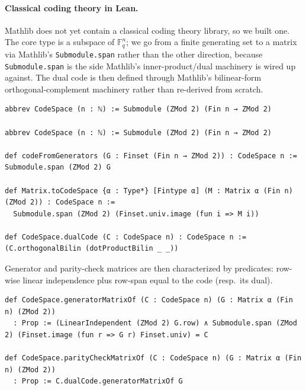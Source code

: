 \paragraph{Classical coding theory in Lean.} Mathlib does not yet contain a
classical coding theory library, so we built one. The core type is a subspace of
$\mathbb{F}_q^n$; we go from a finite generating set to a matrix via Mathlib's
\lstinline{Submodule.span} rather than the other direction, because
\lstinline{Submodule.span} is the side Mathlib's inner-product/dual machinery is
wired up against. The dual code is then defined through Mathlib's bilinear-form
orthogonal-complement machinery rather than re-derived from scratch.

\begin{lstlisting}
abbrev CodeSpace (n : ℕ) := Submodule (ZMod 2) (Fin n → ZMod 2)

abbrev CodeSpace (n : ℕ) := Submodule (ZMod 2) (Fin n → ZMod 2)

def codeFromGenerators (G : Finset (Fin n → ZMod 2)) : CodeSpace n :=
Submodule.span (ZMod 2) G

def Matrix.toCodeSpace {α : Type*} [Fintype α] (M : Matrix α (Fin n) (ZMod 2)) : CodeSpace n :=
  Submodule.span (ZMod 2) (Finset.univ.image (fun i => M i))

def CodeSpace.dualCode (C : CodeSpace n) : CodeSpace n := (C.orthogonalBilin (dotProductBilin _ _))
\end{lstlisting}

%

Generator and parity-check matrices are then characterized by predicates:
row-wise linear independence plus row-span equal to the code (resp.\ its dual).

\begin{lstlisting}
def CodeSpace.generatorMatrixOf (C : CodeSpace n) (G : Matrix α (Fin n) (ZMod 2))
  : Prop := (LinearIndependent (ZMod 2) G.row) ∧ Submodule.span (ZMod 2) (Finset.image (fun r => G r) Finset.univ) = C

def CodeSpace.parityCheckMatrixOf (C : CodeSpace n) (G : Matrix α (Fin n) (ZMod 2))
  : Prop := C.dualCode.generatorMatrixOf G
\end{lstlisting}

%

